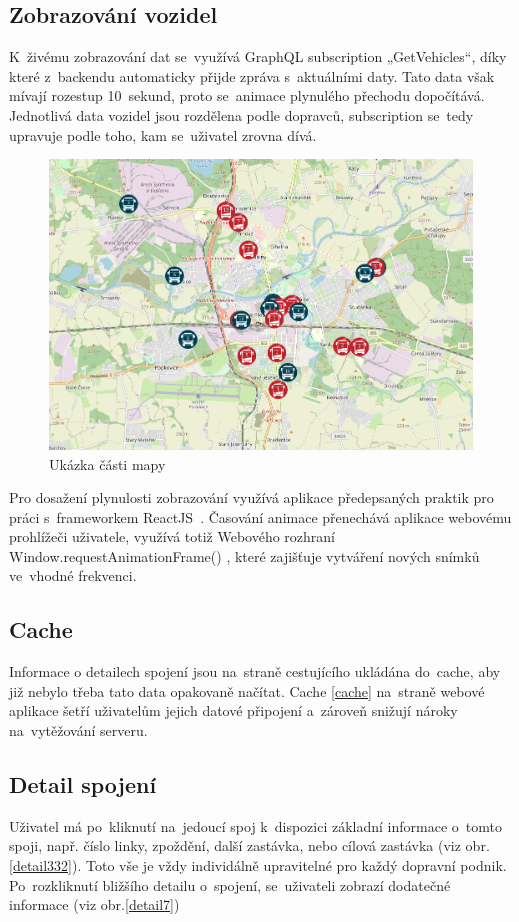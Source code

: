 \subsection{Zobrazování vozidel}
K~živému zobrazování dat se~využívá GraphQL subscription „GetVehicles“, díky které z~backendu automaticky přijde zpráva s~aktuálními daty. Tato data však mívají rozestup 10~sekund, proto se~animace plynulého přechodu dopočítává. Jednotlivá data vozidel jsou rozdělena podle dopravců, subscription se~tedy upravuje podle toho, kam se~uživatel zrovna dívá.
\begin{figure}[H]
    \centering
    \includegraphics[width=1\textwidth]{images/Screenshot from 2023-03-18 20-15-00.png}
    \caption{Ukázka části mapy}
    \label{mapa}
\end{figure}

Pro dosažení plynulosti zobrazování využívá aplikace předepsaných praktik pro práci s~frameworkem ReactJS~\cite{reactlist}. Časování animace přenechává aplikace webovému prohlížeči uživatele, využívá totiž Webového rozhraní Window.requestAnimationFrame() \cite{animationframe}, které zajišťuje vytváření nových snímků ve~vhodné frekvenci.
\subsection{Cache}
Informace o detailech spojení jsou na~straně cestujícího ukládána do~cache, aby již nebylo třeba tato data opakovaně načítat. Cache \ref{cache} na~straně webové aplikace šetří uživatelům jejich datové připojení a~zároveň snižují nároky na~vytěžování serveru.

\subsection{Detail spojení}
Uživatel má po~kliknutí na~jedoucí spoj k~dispozici základní informace o~tomto spoji, např. číslo linky, zpoždění, další zastávka, nebo cílová zastávka (viz obr.\ref{detail332}). Toto vše je vždy individálně upravitelné pro každý dopravní podnik. Po~rozkliknutí bližšího detailu o~spojení, se~uživateli zobrazí dodatečné informace (viz obr.\ref{detail7})

